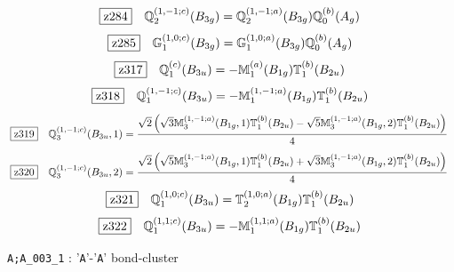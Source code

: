 \documentclass[fleqn,10pt,landscape]{jsarticle}
\begin{document}
\begin{dmath*}
\hspace*{3mm}\fbox{z284}\quad \mathbb{Q}_{2}^{(1,-1;c)}(B_{3g})=\mathbb{Q}_{2}^{(1,-1;a)}(B_{3g}) \mathbb{Q}_{0}^{(b)}(A_{g})
\end{dmath*}
\begin{dmath*}
\hspace*{3mm}\fbox{z285}\quad \mathbb{G}_{1}^{(1,0;c)}(B_{3g})=\mathbb{G}_{1}^{(1,0;a)}(B_{3g}) \mathbb{Q}_{0}^{(b)}(A_{g})
\end{dmath*}
\begin{dmath*}
\hspace*{3mm}\fbox{z317}\quad \mathbb{Q}_{1}^{(c)}(B_{3u})=- \mathbb{M}_{1}^{(a)}(B_{1g}) \mathbb{T}_{1}^{(b)}(B_{2u})
\end{dmath*}
\begin{dmath*}
\hspace*{3mm}\fbox{z318}\quad \mathbb{Q}_{1}^{(1,-1;c)}(B_{3u})=- \mathbb{M}_{1}^{(1,-1;a)}(B_{1g}) \mathbb{T}_{1}^{(b)}(B_{2u})
\end{dmath*}
\begin{dmath*}
\hspace*{3mm}\fbox{z319}\quad \mathbb{Q}_{3}^{(1,-1;c)}(B_{3u},1)=\frac{\sqrt{2} \left(\sqrt{3} \mathbb{M}_{3}^{(1,-1;a)}(B_{1g},1) \mathbb{T}_{1}^{(b)}(B_{2u}) - \sqrt{5} \mathbb{M}_{3}^{(1,-1;a)}(B_{1g},2) \mathbb{T}_{1}^{(b)}(B_{2u})\right)}{4}
\end{dmath*}
\begin{dmath*}
\hspace*{3mm}\fbox{z320}\quad \mathbb{Q}_{3}^{(1,-1;c)}(B_{3u},2)=\frac{\sqrt{2} \left(\sqrt{5} \mathbb{M}_{3}^{(1,-1;a)}(B_{1g},1) \mathbb{T}_{1}^{(b)}(B_{2u}) + \sqrt{3} \mathbb{M}_{3}^{(1,-1;a)}(B_{1g},2) \mathbb{T}_{1}^{(b)}(B_{2u})\right)}{4}
\end{dmath*}
\begin{dmath*}
\hspace*{3mm}\fbox{z321}\quad \mathbb{Q}_{1}^{(1,0;c)}(B_{3u})=\mathbb{T}_{2}^{(1,0;a)}(B_{1g}) \mathbb{T}_{1}^{(b)}(B_{2u})
\end{dmath*}
\begin{dmath*}
\hspace*{3mm}\fbox{z322}\quad \mathbb{Q}_{1}^{(1,1;c)}(B_{3u})=- \mathbb{M}_{1}^{(1,1;a)}(B_{1g}) \mathbb{T}_{1}^{(b)}(B_{2u})
\end{dmath*}
\vspace{5mm}

\noindent\textbullet\, \texttt{A;A_003_1} : '\texttt{A}'-'\texttt{A}' bond-cluster
\end{document}
